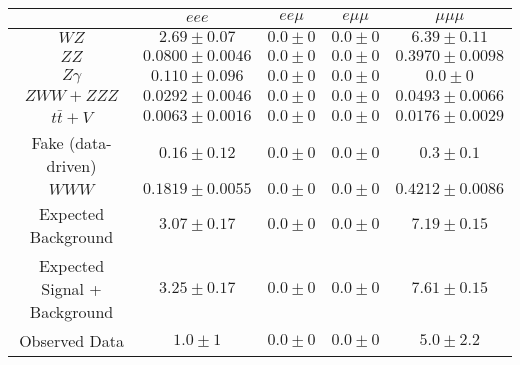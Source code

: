 \begin{tabular}{|c||c|c|c|c|}
\hline
 & $eee$ & $ee\mu$ & $e\mu\mu$ & $\mu\mu\mu$\\ 
\hline\hline
$WZ$ &  $2.69 \pm 0.07$ &  $0.0 \pm 0$ &  $0.0 \pm 0$ &  $6.39 \pm 0.11$\\ 
$ZZ$ &  $0.0800 \pm 0.0046$ &  $0.0 \pm 0$ &  $0.0 \pm 0$ &  $0.3970 \pm 0.0098$\\ 
$Z\gamma$ &  $0.110 \pm 0.096$ &  $0.0 \pm 0$ &  $0.0 \pm 0$ &  $0.0 \pm 0$\\ 
$ZWW+ZZZ$ &  $0.0292 \pm 0.0046$ &  $0.0 \pm 0$ &  $0.0 \pm 0$ &  $0.0493 \pm 0.0066$\\ 
$t\bar{t}+V$ &  $0.0063 \pm 0.0016$ &  $0.0 \pm 0$ &  $0.0 \pm 0$ &  $0.0176 \pm 0.0029$\\ 
Fake (data-driven) &  $0.16 \pm 0.12$ &  $0.0 \pm 0$ &  $0.0 \pm 0$ &  $0.3 \pm 0.1$\\ 
$WWW$ &  $0.1819 \pm 0.0055$ &  $0.0 \pm 0$ &  $0.0 \pm 0$ &  $0.4212 \pm 0.0086$\\ 
\hline
Expected Background &  $3.07 \pm 0.17$ &  $0.0 \pm 0$ &  $0.0 \pm 0$ &  $7.19 \pm 0.15$\\ 
Expected Signal + Background &  $3.25 \pm 0.17$ &  $0.0 \pm 0$ &  $0.0 \pm 0$ &  $7.61 \pm 0.15$\\ 
\hline
Observed Data &  $1.0 \pm 1$ &  $0.0 \pm 0$ &  $0.0 \pm 0$ &  $5.0 \pm 2.2$\\ 
\hline
\end{tabular}
